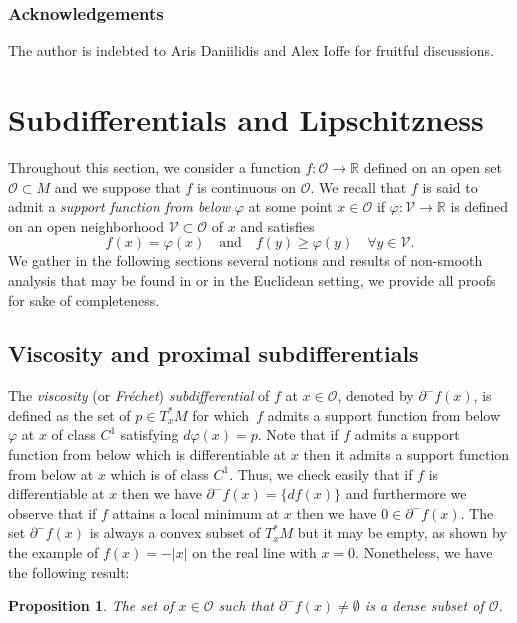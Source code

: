 \documentclass[JEP,XML,SOM,Unicode,NoFloatCountersInSection,published]{cedram}
\newcommand\R{\mathbb R}
\newtheorem{proposition}[theorem]{Proposition}
\theoremstyle{definition}
\begin{document}
\subsubsection*{Acknowledgements} The author is indebted to Aris Daniilidis and Alex Ioffe for fruitful discussions.

\section{Subdifferentials and Lipschitzness}\label{SECSubLip}

Throughout this section, we consider a function $f:\mathcal{O} \to \R$ defined on an open set $\mathcal{O}\subset M$ and we suppose that $f$ is continuous on $\mathcal{O}$. We recall that $f$ is said to admit a {\it support function from below} $\varphi$ at some point $x\in \mathcal{O}$ if $\varphi:\mathcal{V} \to \R$ is defined on an open neighborhood $\mathcal{V}\subset \mathcal{O}$ of $x$ and satisfies
\[
f(x) = \varphi(x) \quad \text{and} \quad f(y) \geq \varphi(y) \quad \forall y \in \mathcal{V}.
\]
We gather in the following sections several notions and results of non-smooth analysis that may be found in \cite{clsw98} or \cite{rw98} in the Euclidean setting, we provide all proofs for sake of completeness.

\subsection{Viscosity and proximal subdifferentials}

The {\it viscosity} (or {\it Fréchet}) {\it subdifferential} of $f$ at $x\in \mathcal{O}$, denoted by $\partial^-f(x)$, is defined as the set of $p\in T_x^*M$ for which~$f$ admits a support function from below $\varphi$ at $x$ of class $C^1$ satisfying $d\varphi(x)=p$. Note that if $f$ admits a support function from below which is differentiable at $x$ then it admits a support function from below at $x$ which is of class $C^1$. Thus, we check easily that if $f$ is differentiable at $x$ then we have $\partial^-f(x)=\{df(x)\}$ and furthermore we observe that if $f$ attains a local minimum at $x$ then we have $0\in \partial^-f(x)$. The set $\partial^-f(x)$ is always a convex subset of $T_x^*M$ but it may be empty, as shown by the example of $f(x)=-|x|$ on the real line with $x=0$. Nonetheless, we have the following result:

\begin{proposition}\label{PROPnonemptydense}
The set of $x\in \mathcal{O}$ such that $\partial^-f(x)\neq \emptyset$ is a dense subset of $\mathcal{O}$.
\end{proposition}
\end{document}

